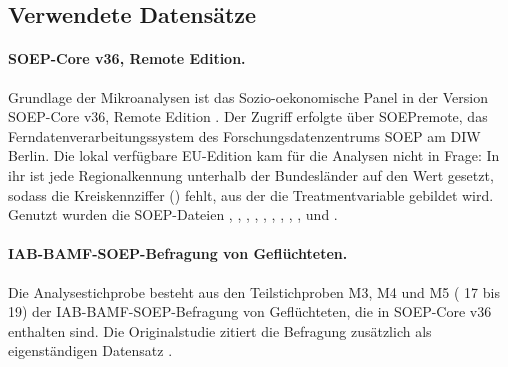 \subsection{Verwendete Datensätze}
\label{app:daten}

\paragraph{SOEP-Core v36, Remote Edition.} Grundlage der Mikroanalysen ist das Sozio-oekonomische Panel in der Version SOEP-Core v36, Remote Edition \parencite{soep_core_v36r}. Der Zugriff erfolgte über SOEPremote, das Ferndatenverarbeitungssystem des Forschungsdatenzentrums SOEP am DIW Berlin. Die lokal verfügbare EU-Edition \parencite{soep_group_2021} kam für die Analysen nicht in Frage: In ihr ist jede Regionalkennung unterhalb der Bundesländer auf den Wert  gesetzt, sodass die Kreiskennziffer () fehlt, aus der die Treatmentvariable gebildet wird. Genutzt wurden die SOEP-Dateien , , , , , , , , ,  und .

\paragraph{IAB-BAMF-SOEP-Befragung von Geflüchteten.} Die Analysestichprobe besteht aus den Teilstichproben M3, M4 und M5 ( 17 bis 19) der IAB-BAMF-SOEP-Befragung von Geflüchteten, die in SOEP-Core v36 enthalten sind. Die Originalstudie zitiert die Befragung zusätzlich als eigenständigen Datensatz \parencite{iab_bamf_soep_2021}.

